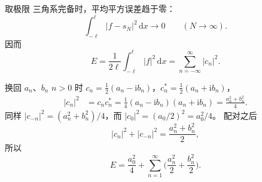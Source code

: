 \documentclass[fontset=windows, chinese, 10pt, xcolor=dvipsnames]{beamer}
\begin{document}
\begin{frame}{取极限}
  三角系完备时，平均平方误差趋于零：
  \begin{equation*}
    \int_{-\ell}^{\ell}|f-s_N|^2\,\mathrm{d}x\to 0
    \qquad(N\to\infty).
  \end{equation*}
  因而
  \begin{equation*}
    E=\frac{1}{2\ell}\int_{-\ell}^{\ell}|f|^2\,\mathrm{d}x
    =\sum_{n=-\infty}^{\infty}|c_n|^2.
  \end{equation*}
\end{frame}

\begin{frame}{换回 $a_n$、$b_n$}
  $n>0$ 时 $c_n=\tfrac12(a_n-\mathrm{i} b_n)$，$c_n^*=\tfrac12(a_n+\mathrm{i} b_n)$，
  \begin{align*}
    |c_n|^2
    &=c_n c_n^*
     =\frac14(a_n-\mathrm{i} b_n)(a_n+\mathrm{i} b_n)
     =\frac{a_n^2+b_n^2}{4}.
  \end{align*}
  同样 $|c_{-n}|^2=(a_n^2+b_n^2)/4$，而 $|c_0|^2=(a_0/2)^2=a_0^2/4$。
  配对之后
  \begin{equation*}
    |c_n|^2+|c_{-n}|^2=\frac{a_n^2+b_n^2}{2},
  \end{equation*}
  所以
  \begin{equation*}
    E=\frac{a_0^2}{4}
      +\sum_{n=1}^{\infty}
        \Biggl(\frac{a_n^2}{2}+\frac{b_n^2}{2}\Biggr).
  \end{equation*}
\end{frame}
\end{document}
